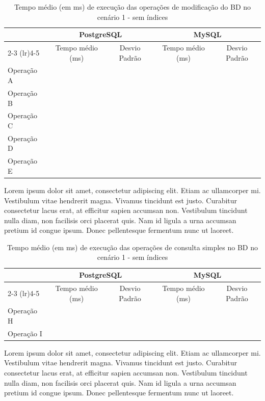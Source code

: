 \documentclass[12pt,a4paper]{article}
\begin{document}
\begin{table}[H]
\centering
\caption{Tempo médio (em ms) de execução das operações de modificação do BD no cenário 1 - sem índices}
\begin{tabular}{lcccc}
\toprule
& \multicolumn{2}{c}{PostgreSQL} & \multicolumn{2}{c}{MySQL} \\
\cmidrule(lr){2-3} \cmidrule(lr){4-5}
& Tempo médio (ms) & Desvio Padrão & Tempo médio (ms) & Desvio Padrão \\
\midrule
Operação A & & & & \\
Operação B & & & & \\
Operação C & & & & \\
Operação D & & & & \\
Operação E & & & & \\
\bottomrule
\end{tabular}
\label{tab:modificacao}
\end{table}

Lorem ipsum dolor sit amet, consectetur adipiscing elit. Etiam ac ullamcorper mi. Vestibulum vitae hendrerit magna. Vivamus tincidunt est justo. Curabitur consectetur lacus erat, at efficitur sapien accumsan non. Vestibulum tincidunt nulla diam, non facilisis orci placerat quis. Nam id ligula a urna accumsan pretium id congue ipsum. Donec pellentesque fermentum nunc ut laoreet.

\begin{table}[H]
\centering
\caption{Tempo médio (em ms) de execução das operações de consulta simples no BD no cenário 1 - sem índices}
\begin{tabular}{lcccc}
\toprule
& \multicolumn{2}{c}{PostgreSQL} & \multicolumn{2}{c}{MySQL} \\
\cmidrule(lr){2-3} \cmidrule(lr){4-5}
& Tempo médio (ms) & Desvio Padrão & Tempo médio (ms) & Desvio Padrão \\
\midrule
Operação H & & & & \\
Operação I & & & & \\
\bottomrule
\end{tabular}
\label{tab:consulta_simples}
\end{table}

Lorem ipsum dolor sit amet, consectetur adipiscing elit. Etiam ac ullamcorper mi. Vestibulum vitae hendrerit magna. Vivamus tincidunt est justo. Curabitur consectetur lacus erat, at efficitur sapien accumsan non. Vestibulum tincidunt nulla diam, non facilisis orci placerat quis. Nam id ligula a urna accumsan pretium id congue ipsum. Donec pellentesque fermentum nunc ut laoreet.
\end{document}
